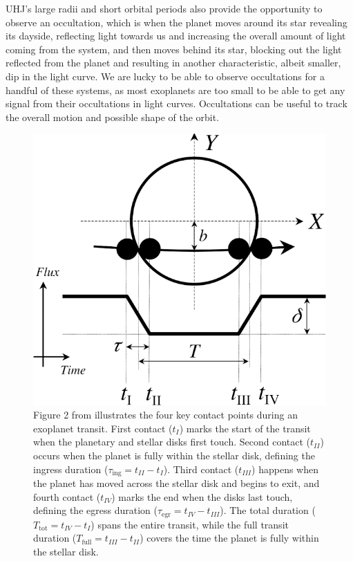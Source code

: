 \documentclass[oneside,12pt]{amsart}
\numberwithin{page}{section}
\begin{document}
UHJ's large radii and short orbital periods also provide the opportunity to observe an occultation, which is when the planet moves around its star revealing its dayside, reflecting light towards us and increasing the overall amount of light coming from the system, and then moves behind its star, blocking out the light reflected from the planet and resulting in another characteristic, albeit smaller, dip in the light curve. We are lucky to be able to observe occultations for a handful of these systems, as most exoplanets are too small to be able to get any signal from their occultations in light curves. Occultations can be useful to track the overall motion and possible shape of the orbit. 

\begin{figure}[htbp]
    \centering
    \includegraphics[width=0.6\linewidth]{figs/winn_fig2.png}
    \caption{Figure 2 from \citet{winn2010transits} illustrates the four key contact points during an exoplanet transit. First contact ($t_I$) marks the start of the transit when the planetary and stellar disks first touch. Second contact ($t_{II}$) occurs when the planet is fully within the stellar disk, defining the ingress duration ($\tau_\text{ing} = t_{II} - t_I$). Third contact ($t_{III}$) happens when the planet has moved across the stellar disk and begins to exit, and fourth contact ($t_{IV}$) marks the end when the disks last touch, defining the egress duration ($\tau_\text{egr} = t_{IV} - t_{III}$). The total duration ($T_\text{tot} = t_{IV} - t_{I}$) spans the entire transit, while the full transit duration ($T_\text{full} = t_{III} - t_{II}$) covers the time the planet is fully within the stellar disk.}
    \label{fig:winnfig2}
\end{figure}
\end{document}
